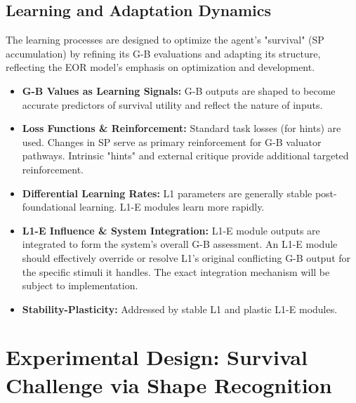 \documentclass{article}
\begin{document}
\subsection{Learning and Adaptation Dynamics}
The learning processes are designed to optimize the agent's "survival" (SP accumulation) by refining its G-B evaluations and adapting its structure, reflecting the EOR model's emphasis on optimization and development.
\begin{itemize}
    \item \textbf{G-B Values as Learning Signals:} G-B outputs are shaped to become accurate predictors of survival utility and reflect the nature of inputs.
    \item \textbf{Loss Functions \& Reinforcement:} Standard task losses (for hints) are used. Changes in SP serve as primary reinforcement for G-B valuator pathways. Intrinsic "hints" and external critique provide additional targeted reinforcement.
    \item \textbf{Differential Learning Rates:} L1 parameters are generally stable post-foundational learning. L1-E modules learn more rapidly.
    \item \textbf{L1-E Influence \& System Integration:} L1-E module outputs are integrated to form the system's overall G-B assessment. An L1-E module should effectively override or resolve L1's original conflicting G-B output for the specific stimuli it handles. The exact integration mechanism will be subject to implementation.
    \item \textbf{Stability-Plasticity:} Addressed by stable L1 and plastic L1-E modules.
\end{itemize}

\section{Experimental Design: Survival Challenge via Shape Recognition}
\end{document}
